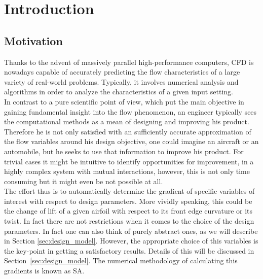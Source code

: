 
\section{Introduction}\label{chapt:introduction}


\subsection{Motivation}\label{sec:motivation}
Thanks to the advent of massively parallel high-performance computers, \ac{CFD} is nowadays capable of accurately predicting the flow characteristics of a large variety of real-world problems. Typically, it involves numerical analysis and algorithms in order to analyze the characteristics of a given input setting.\\
In contrast to a pure scientific point of view, which put the main objective in gaining fundamental insight into the flow phenomenon, an engineer typically sees the computational methods as a mean of designing and improving his product. Therefore he is not only satisfied with an sufficiently accurate approximation of the flow variables around his design objective, one could imagine an aircraft or an automobile, but he seeks to use that information to improve his product.
For trivial cases it might be intuitive to identify opportunities for improvement, in a highly complex system with mutual interactions, however, this is not only time consuming but it might even be not possible at all.\\

The effort thus is to automatically determine the gradient of specific variables of interest with respect to design parameters. More vividly speaking, this could be the change of lift of a given airfoil with respect to its front edge curvature or its twist. In fact there are not restrictions when it comes to the choice of the design parameters. In fact one can also think of purely abstract ones, as we will describe in Section \ref{sec:design_model}. However, the appropriate choice of this variables is the key-point in getting a satisfactory results. Details of this will be discussed in Section~\ref{sec:design_model}.
The numerical methodology of calculating this gradients is known as \ac{SA}.\\

